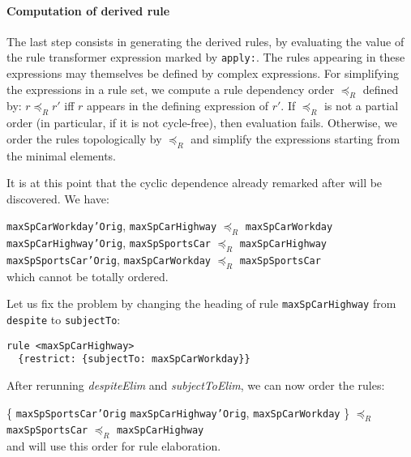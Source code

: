 \paragraph{\textbf{Computation of derived rule}}
The last step consists in generating the derived rules, by evaluating the value
of the rule transformer expression marked by \texttt{apply:}. The rules
appearing in these expressions may themselves be defined by complex
expressions. For simplifying the expressions in a rule set, we compute a rule
dependency order $\preceq_R$ defined by: $r \preceq_R r'$ iff $r$ appears in
the defining expression of $r'$. If $\preceq_R$ is not a partial order (in
particular, if it is not cycle-free), then evaluation fails. Otherwise, we
order the rules topologically by $\preceq_R$ and simplify the
expressions starting from the minimal elements.

\begin{example}
It is at this point that the cyclic dependence already remarked after
 will be discovered. We have:

\noindent
\texttt{maxSpCarWorkday'Orig}, \texttt{maxSpCarHighway} $\preceq_R$ \texttt{maxSpCarWorkday}\\
\texttt{maxSpCarHighway'Orig}, \texttt{maxSpSportsCar} $\preceq_R$ \texttt{maxSpCarHighway}\\
\texttt{maxSpSportsCar'Orig}, \texttt{maxSpCarWorkday} $\preceq_R$  \texttt{maxSpSportsCar}\\
\noindent
which cannot be totally ordered.

Let us fix the problem by changing the heading of rule
\texttt{maxSpCarHighway} from \texttt{despite} to \texttt{subjectTo}:
\begin{lstlisting}
rule <maxSpCarHighway>
  {restrict: {subjectTo: maxSpCarWorkday}}
\end{lstlisting}

After rerunning \emph{despiteElim} and \emph{subjectToElim}, we can now order
the rules:


\noindent
\{ \texttt{maxSpSportsCar'Orig}
\texttt{maxSpCarHighway'Orig},
\texttt{maxSpCarWorkday} \} $\preceq_R$
\texttt{maxSpSportsCar} $\preceq_R$
\texttt{maxSpCarHighway}\\
and will use this order for rule elaboration.
\end{example}


